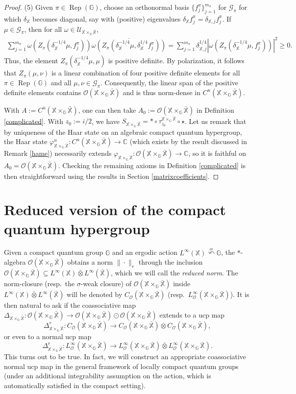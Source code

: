 \documentclass[reqno]{amsart}
\numberwithin{equation}{section}
\newcommand\XGX{\X\times_\G \bar{\X}}
\DeclareMathOperator{\Rep}{\mathrm{Rep}}
\newcommand{\mcG}{\mathcal{G}}
\newcommand{\mcO}{\mathcal{O}}
\newcommand{\C}{\mathbb{C}}
\newcommand{\G}{\mathbb{G}}
\newcommand{\X}{\mathbb{X}}
\newcommand{\ovot}{\bar{\otimes}}
\begin{document}
\begin{proof}
(5) Given $\pi \in \Rep(\G)$, choose an orthonormal basis $\{f_j^\pi\}_{j=1}^{m_\pi}$ for $\mcG_\pi$ for which $\delta_\X$ becomes diagonal, say with (positive) eigenvalues $\delta_\X f_j^\pi = \delta_{\X,j} f_j^\pi$. If $\mu \in \mcG_\pi$, then for all $\omega \in \mathscr{U}_{\XGX}$,
    \begin{align*}
        \sum_{j=1}^{m_\pi} \omega(Z_\pi(\delta_\X^{-1/4}\mu, f_j^\pi)) \overline{\omega(Z_\pi(\delta_\X^{-1/4}\mu, \delta_\X^{1/4}f_j^\pi))} = \sum_{j=1}^{m_\pi} \delta_{\X,j}^{1/4}|\omega(Z_\pi(\delta_\X^{-1/4}\mu, f_j^\pi))|^2\ge 0.
    \end{align*} %
    Thus, the element $Z_\pi(\delta_\X^{-1/4}\mu, \mu)$ is positive definite. By polarization, it follows that $Z_\pi(\mu, \nu)$ is a linear combination of four positive definite elements for all $\pi \in \Rep(\G)$ and all $\mu, \nu \in \mcG_\pi$. Consequently, the linear span of the positive definite elements contains $\mcO(\XGX)$ and is thus norm-dense in $C^u(\XGX)$.

  With $A:= C^u(\XGX)$, one can then take $A_0:= \mcO(\XGX)$ in Definition \ref{complicated}. With $z_0:= i/2$, we have $S_{\XGX}= *\circ \tau_{z_0}^{\XGX}\circ \star$. Let us remark that by uniqueness of the Haar state on an algebraic compact quantum hypergroup, the Haar state $\varphi_{\XGX}^u: C^u(\XGX)\to \C$ (which exists by the result discussed in Remark \ref{hame}) necessarily extends $\varphi_{\XGX}: \mcO(\XGX)\to \C$, so it is faithful on $A_0= \mcO(\XGX)$. Checking the remaining axioms in Definition \ref{complicated} is then straightforward using the results in Section \ref{matrixcoefficients}. 
 \end{proof}


\section{Reduced version of the compact quantum hypergroup}
\label{reducedversion}
Given a compact quantum group $\G$ and an ergodic action $L^\infty(\X)\stackrel{\alpha}\curvearrowleft \G$, the $*$-algebra
$\mcO(\XGX)$ obtains a norm $\|\cdot\|_r$ through the inclusion $\mcO(\XGX)\subseteq L^\infty(\X)\ovot L^\infty(\bar{\X})$, which we will call the \emph{reduced norm}. The norm-closure (resp.\ the $\sigma$-weak closure) of $\mcO(\XGX)$ inside $L^\infty(\X)\ovot L^\infty(\bar{\X})$ will be denoted by $C_\mcO(\XGX)$ (resp.\ $L^\infty_\mcO(\XGX)$). It is then natural to ask if the coassociative map
$\Delta_{\XGX}: \mcO(\XGX)\to \mcO(\XGX)\odot \mcO(\XGX)$ extends to a ucp map
$$\Delta_{\XGX}^r: C_\mcO(\XGX)\to C_\mcO(\XGX)\otimes C_\mcO(\XGX),$$
or even to a normal ucp map
$$\Delta_{\XGX}^r: L^\infty_\mcO(\XGX)\to L^\infty_\mcO(\XGX)\ovot L^\infty_\mcO(\XGX).$$
This turns out to be true. In fact, we will construct an appropriate coassociative normal ucp map in the general framework of locally compact quantum groups (under an additional integrability assumption on the action, which is automatically satisfied in the compact setting).
\end{document}
